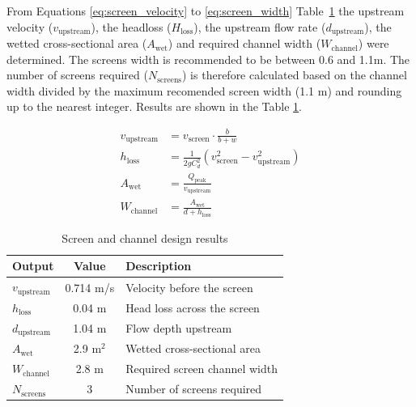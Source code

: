 \documentclass[12pt]{article}
\begin{document}
From Equations \eqref{eq:screen_velocity} to 
\eqref{eq:screen_width}
 Table~\ref{tab:screen_outputs} the upstream velocity ($v_\text{upstream}$), 
the headloss ($H_\text{loss}$), the upstream flow rate ($d_\text{upstream}$), 
the wetted cross-sectional area ($A_\text{wet}$) and required channel width ($W_\text{channel}$) 
were determined.
The screens width is recommended to be between 0.6 and 1.1m. 
The number of screens required ($N_\text{screens}$) is therefore calculated based on the 
channel width divided by the maximum recomended screen width (1.1 m) and 
rounding up to the nearest integer. Results are shown 
in the Table \ref{tab:screen_outputs}.

\begin{align}
  v_{\text{upstream}} &= v_{\text{screen}} \cdot \frac{b}{b + w} \label{eq:screen_velocity} \\
  h_{\text{loss}} &= \frac{1}{2g C_d^2} \left( v_{\text{screen}}^2 - v_{\text{upstream}}^2 \right) \label{eq:screen_headloss} \\
  A_{\text{wet}} &= \frac{Q_{\text{peak}}}{v_{\text{upstream}}} \label{eq:screen_area} \\
  W_{\text{channel}} &= \frac{A_{\text{wet}}}{d + h_{\text{loss}}} \label{eq:screen_width}
  \end{align}

\begin{table}[h]
\centering
\caption{Screen and channel design results}
\label{tab:screen_outputs}
\begin{tabular}{|l|c|l|}
\hline
\textbf{Output} & \textbf{Value} & \textbf{Description} \\
\hline
$v_{\text{upstream}}$ & 
0.714
 m/s
& Velocity before the screen \\
$h_{\text{loss}}$ & 
0.04
 m
& Head loss across the screen \\
$d_{\text{upstream}}$ & 
1.04
m & Flow depth upstream \\
$A_{\text{wet}}$ & 
2.9
m$^2$ & Wetted cross-sectional area \\
$W_{\text{channel}}$ & 
2.8
m & Required screen channel width \\
$N_{\text{screens}}$ & 
3
& Number of screens required \\
\hline
\end{tabular}
\end{table}
\end{document}
